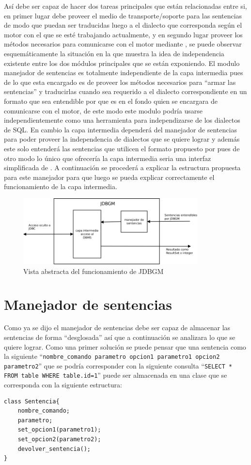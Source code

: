Así \jj debe ser capaz de hacer dos tareas principales que están relacionadas entre si, en primer lugar debe proveer el medio de transporte/soporte para las sentencias de modo que puedan ser traducidas luego a el dialecto que corresponda según el motor con el que se esté trabajando actualmente, y en segundo lugar proveer los métodos necesarios para comunicarse con el motor mediante \jd, se puede observar esquemáticamente la situación en la  que muestra la idea de independencia existente entre los dos módulos principales que se están exponiendo. El modulo manejador de sentencias es totalmente independiente de la capa intermedia pues de lo que esta encargado es de proveer los métodos necesarios para ``armar las sentencias'' y traducirlas cuando sea requerido a el dialecto correspondiente en un formato que sea entendible por \jd que es en el fondo quien se encargara de comunicarse con el motor, de este modo este modulo podría usarse independientemente como una herramienta para independizarse de los dialectos de SQL. En cambio la capa intermedia dependerá del manejador de sentencias para poder proveer la independencia de dialectos que se quiere lograr y además este solo entenderá las sentencias que utilicen el formato propuesto por \jj pues de otro modo lo único que ofrecería la capa intermedia seria una interfaz simplificada de \jd. A continuación se procederá a explicar la estructura propuesta para este manejador para que luego se pueda explicar correctamente el funcionamiento de la capa intermedia.
%
\begin{figure}
  \centering
    \includegraphics[width=0.85\textwidth]{figuras/jdbgm-closerlook.png}
  \caption{Vista abstracta del funcionamiento de JDBGM}
  \label{fig:jdbgm:closerlook}
\end{figure}

\section{Manejador de sentencias}
Como ya se dijo el manejador de sentencias debe ser capaz de almacenar las sentencias de forma ``desglosada'' así que a continuación se analizara lo que se quiere lograr. Como una primer solución se puede pensar que una sentencia como la siguiente ``\verb=nombre_comando parametro opcion1 parametro1 opcion2 parametro2='' que se podría corresponder con la siguiente consulta ``\verb|SELECT * FROM table WHERE table.id=1|'' puede ser almacenada en una clase que se corresponda con la siguiente estructura:
%
\begin{lstlisting}[title=Pseudocódigo de la estructura de dato que contiene la sentencia]
class Sentencia{
	nombre_comando;
	parametro;
	set_opcion1(parametro1);
	set_opcion2(parametro2);
	devolver_sentencia();
}
\end{lstlisting}

